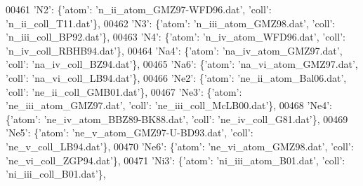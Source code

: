 \begin{DoxyCode}
00461                              \textcolor{stringliteral}{'N2'}: \{\textcolor{stringliteral}{'atom'}: \textcolor{stringliteral}{'n\_ii\_atom\_GMZ97-WFD96.dat'}, \textcolor{stringliteral}{'coll'}: \textcolor{stringliteral}{'n\_ii\_coll\_T11.dat'}\},
00462                              \textcolor{stringliteral}{'N3'}: \{\textcolor{stringliteral}{'atom'}: \textcolor{stringliteral}{'n\_iii\_atom\_GMZ98.dat'}, \textcolor{stringliteral}{'coll'}: \textcolor{stringliteral}{'n\_iii\_coll\_BP92.dat'}\},
00463                              \textcolor{stringliteral}{'N4'}: \{\textcolor{stringliteral}{'atom'}: \textcolor{stringliteral}{'n\_iv\_atom\_WFD96.dat'}, \textcolor{stringliteral}{'coll'}: \textcolor{stringliteral}{'n\_iv\_coll\_RBHB94.dat'}\},
00464                              \textcolor{stringliteral}{'Na4'}: \{\textcolor{stringliteral}{'atom'}: \textcolor{stringliteral}{'na\_iv\_atom\_GMZ97.dat'}, \textcolor{stringliteral}{'coll'}: \textcolor{stringliteral}{'na\_iv\_coll\_BZ94.dat'}\},
00465                              \textcolor{stringliteral}{'Na6'}: \{\textcolor{stringliteral}{'atom'}: \textcolor{stringliteral}{'na\_vi\_atom\_GMZ97.dat'}, \textcolor{stringliteral}{'coll'}: \textcolor{stringliteral}{'na\_vi\_coll\_LB94.dat'}\},
00466                              \textcolor{stringliteral}{'Ne2'}: \{\textcolor{stringliteral}{'atom'}: \textcolor{stringliteral}{'ne\_ii\_atom\_Bal06.dat'}, \textcolor{stringliteral}{'coll'}: \textcolor{stringliteral}{'ne\_ii\_coll\_GMB01.dat'}\},
00467                              \textcolor{stringliteral}{'Ne3'}: \{\textcolor{stringliteral}{'atom'}: \textcolor{stringliteral}{'ne\_iii\_atom\_GMZ97.dat'}, \textcolor{stringliteral}{'coll'}: \textcolor{stringliteral}{'ne\_iii\_coll\_McLB00.dat'}\},
00468                              \textcolor{stringliteral}{'Ne4'}: \{\textcolor{stringliteral}{'atom'}: \textcolor{stringliteral}{'ne\_iv\_atom\_BBZ89-BK88.dat'}, \textcolor{stringliteral}{'coll'}: \textcolor{stringliteral}{'ne\_iv\_coll\_G81.dat'}\},
00469                              \textcolor{stringliteral}{'Ne5'}: \{\textcolor{stringliteral}{'atom'}: \textcolor{stringliteral}{'ne\_v\_atom\_GMZ97-U-BD93.dat'}, \textcolor{stringliteral}{'coll'}: \textcolor{stringliteral}{'ne\_v\_coll\_LB94.dat'}\},
00470                              \textcolor{stringliteral}{'Ne6'}: \{\textcolor{stringliteral}{'atom'}: \textcolor{stringliteral}{'ne\_vi\_atom\_GMZ98.dat'}, \textcolor{stringliteral}{'coll'}: \textcolor{stringliteral}{'ne\_vi\_coll\_ZGP94.dat'}\},
00471                              \textcolor{stringliteral}{'Ni3'}: \{\textcolor{stringliteral}{'atom'}: \textcolor{stringliteral}{'ni\_iii\_atom\_B01.dat'}, \textcolor{stringliteral}{'coll'}: \textcolor{stringliteral}{'ni\_iii\_coll\_B01.dat'}\},

\end{DoxyCode}
